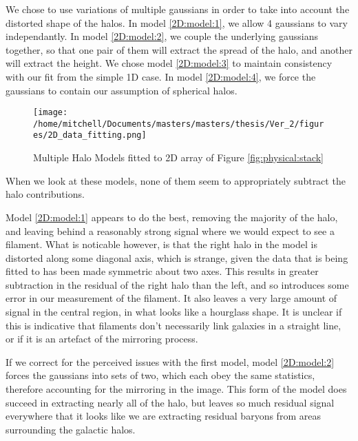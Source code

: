 We chose to use variations of multiple gaussians in order to take into account the distorted shape of the halos. In model \ref{2D:model:1}, we allow 4 gaussians to vary independantly. In model \ref{2D:model:2}, we couple the underlying gaussians together, so that one pair of them will extract the spread of the halo, and another will extract the height. We chose model \ref{2D:model:3} to maintain consistency with our fit from the simple 1D case. In model \ref{2D:model:4}, we force the gaussians to contain our assumption of spherical halos. 

\begin{figure}[h!]
\centering
\texttt{[image: /home/mitchell/Documents/masters/masters/thesis/Ver\_2/figures/2D\_data\_fitting.png]}
\caption{ Multiple Halo Models fitted to 2D array of Figure \ref{fig:physical:stack} }
\label{fig:halo:2D_complex_model}
\end{figure}

When we look at these models, none of them seem to appropriately subtract the halo contributions. 
\par Model \ref{2D:model:1} appears to do the best, removing the majority of the halo, and leaving behind a reasonably strong signal where we would expect to see a filament. What is noticable however, is that the right halo in the model is distorted along some diagonal axis, which is strange, given the data that is being fitted to has been made symmetric about two axes. This results in greater subtraction in the residual of the right halo than the left, and so introduces some error in our measurement of the filament. It also leaves a very large amount of signal in the central region, in what looks like a hourglass shape. It is unclear if this is indicative that filaments don't necessarily link galaxies in a straight line, or if it is an artefact of the mirroring process.
\par If we correct for the perceived issues with the first model, model \ref{2D:model:2} forces the gaussians into sets of two, which each obey the same statistics, therefore accounting for the mirroring in the image. This form of the model does succeed in extracting nearly all of the halo, but leaves so much residual signal everywhere that it looks like we are extracting residual baryons from areas surrounding the galactic halos. 


